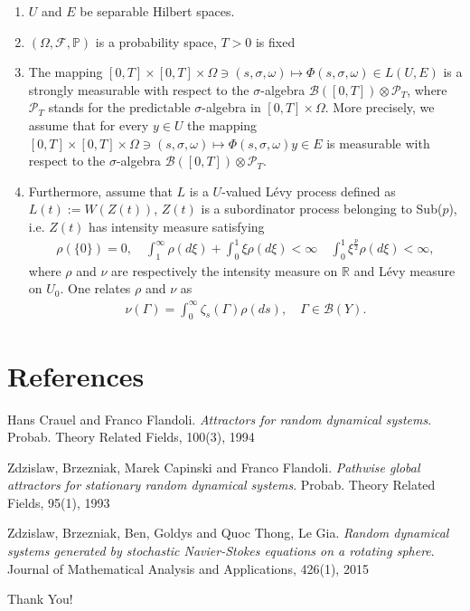 \documentclass[xcolor=dvipsnames,leqno]{beamer}
\newcommand{\R}{\mathbb{R}}
\renewcommand{\P}{\mathbb{P}}
\begin{document}
\begin{frame}
\begin{enumerate}
	\item $U$  and $E$ be separable Hilbert spaces.
	\item $(\Omega,\mathcal{F},\P)$ is a probability space, $T>0$ is fixed
	\item The mapping $[0,T]\times[0,T]\times\Omega\ni (s,\sigma,\omega)\mapsto \Phi(s,\sigma,\omega)\in L(U,E)$ is a strongly measurable with respect to the $\sigma$-algebra $\mathcal B([0,T])\otimes\mathcal P_T$, where $\mathcal P_T$ stands for the predictable $\sigma$-algebra in $[0,T]\times\Omega$. More precisely, we assume that for every $y\in U$ the mapping $[0,T]\times[0,T]\times\Omega\ni (s,\sigma,\omega)\mapsto \Phi(s,\sigma,\omega)y\in E$ is measurable with respect to the $\sigma$-algebra $\mathcal B([0,T])\otimes\mathcal P_T$. 
	\item Furthermore, assume that $L$ is a $U$-valued L\'evy process defined as $L(t):=W(Z(t))$, $Z(t)$ is a subordinator process belonging to Sub($p$), i.e. $Z(t)$ has intensity measure satisfying
	\begin{align*}
	\rho(\{0\})=0,\quad\int_1^{\infty}\rho(d\xi)+\int_0^1\xi\rho(d\xi)<\infty\quad	\int_0^1\xi^{\frac{p}{2}}\rho(d\xi)<\infty,
	\end{align*}
	where $\rho$ and $\nu$ are respectively the intensity measure on $\R$ and L\'evy measure on $U_0$. One relates $\rho$ and $\nu$ as
	\begin{align*}
	\nu(\Gamma)=\int_0^{\infty}\zeta_s(\Gamma)\rho(ds),\quad\Gamma\in\mathcal{B}(Y).
	\end{align*}
\end{enumerate}

\end{frame}
\section{References}

\begin{thebibliography}{9}
Hans Crauel and Franco Flandoli.
\textit{Attractors for random dynamical systems}. 
Probab. Theory Related Fields, 100(3), 1994


Zdzislaw, Brzezniak, Marek Capinski and Franco Flandoli.
\textit{Pathwise global attractors for stationary random dynamical systems}. 
Probab. Theory Related Fields, 95(1), 1993

Zdzislaw, Brzezniak, Ben, Goldys and Quoc Thong, Le Gia.
\textit{Random dynamical systems generated by stochastic {N}avier-{S}tokes equations on a rotating sphere}. 
Journal of Mathematical Analysis and Applications, 426(1), 2015


\end{thebibliography}

\begin{center}
\Huge {\color{Plum}Thank You!}
\end{center}
\end{document}
